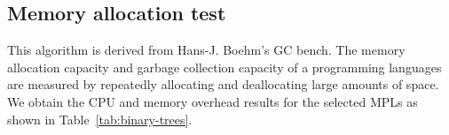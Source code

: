 \subsection{Memory allocation test}
This algorithm is derived from Hans-J. Boehm's GC bench.
The memory allocation capacity and garbage collection capacity of a programming languages
are measured by repeatedly allocating and deallocating large amounts of space.
We obtain the CPU and memory overhead results for the selected MPLs as shown in Table~\ref{tab:binary-trees}.



